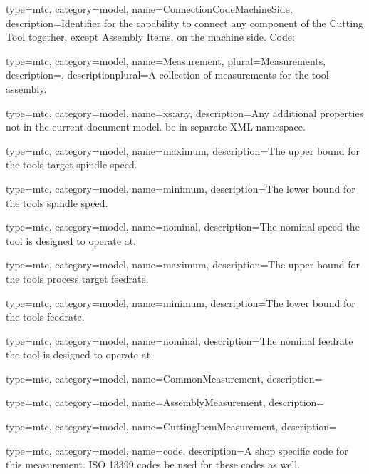 {
  type=mtc,
  category=model,
  name={ConnectionCodeMachineSide},
  description={Identifier for the capability to connect any component of the Cutting Tool together, except Assembly Items, on the machine side. Code: }
}


{
  type=mtc,
  category=model,
  name={Measurement},
  plural={Measurements},
  description={},
  descriptionplural={A collection of measurements for the tool assembly.}
}


{
  type=mtc,
  category=model,
  name={xs:any},
  description={Any additional properties not in the current document model. \MUST be in separate XML namespace.}
}


{
  type=mtc,
  category=model,
  name={maximum},
  description={The upper bound for the tools target spindle speed.}
}


{
  type=mtc,
  category=model,
  name={minimum},
  description={The lower bound for the tools spindle speed.}
}


{
  type=mtc,
  category=model,
  name={nominal},
  description={The nominal speed the tool is designed to operate at.}
}


{
  type=mtc,
  category=model,
  name={maximum},
  description={The upper bound for the tools process target feedrate.}
}


{
  type=mtc,
  category=model,
  name={minimum},
  description={The lower bound for the tools feedrate.}
}


{
  type=mtc,
  category=model,
  name={nominal},
  description={The nominal feedrate the tool is designed to operate at.}
}


{
  type=mtc,
  category=model,
  name={CommonMeasurement},
  description={}
}


{
  type=mtc,
  category=model,
  name={AssemblyMeasurement},
  description={}
}


{
  type=mtc,
  category=model,
  name={CuttingItemMeasurement},
  description={}
}


{
  type=mtc,
  category=model,
  name={code},
  description={A shop specific code for this measurement. ISO 13399 codes \MAY be used for these codes as well.}
}


